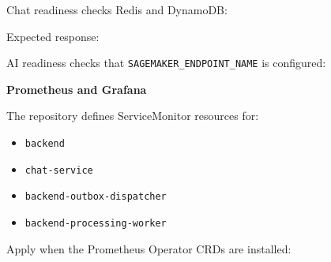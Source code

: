 Chat readiness checks Redis and DynamoDB:

\begin{Shaded}
\begin{Highlighting}[]
 
\end{Highlighting}
\end{Shaded}

Expected response:

\begin{Shaded}
\begin{Highlighting}[]
\FunctionTok{\{}\FunctionTok{:}\FunctionTok{,}\FunctionTok{:\{}\FunctionTok{:}\FunctionTok{,}\FunctionTok{:}\FunctionTok{\}\}}
\end{Highlighting}
\end{Shaded}

AI readiness checks that \texttt{SAGEMAKER\_\allowbreak{}ENDPOINT\_\allowbreak{}NAME} is
configured:

\begin{Shaded}
\begin{Highlighting}[]
 
\end{Highlighting}
\end{Shaded}

\vspace{0.5em}\noindent\textbf{Prometheus and Grafana}\par

The repository defines ServiceMonitor resources for:

\begin{itemize}
\tightlist
\item
  \texttt{backend}
\item
  \texttt{chat-\allowbreak{}service}
\item
  \texttt{backend-\allowbreak{}outbox-\allowbreak{}dispatcher}
\item
  \texttt{backend-\allowbreak{}processing-\allowbreak{}worker}
\end{itemize}

Apply when the Prometheus Operator CRDs are installed:

\begin{Shaded}
\begin{Highlighting}[]
\end{Highlighting}
\end{Shaded}

